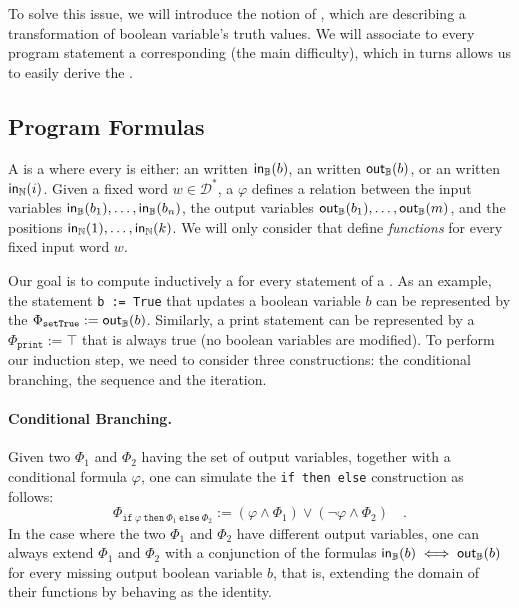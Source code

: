 To solve this issue, we will introduce the notion of ,
which are  describing a transformation of boolean
variable's truth values. We will associate to every program statement a
corresponding  (the main difficulty), which in turns allows
us to easily derive the .



\subsection{Program Formulas}
\label{sec:program-formulas}

\AP A  is a  where every
 is either: an   written
$\mathsf{in}_{\mathbb{B}}(b)$,  an  written $\mathsf{out}_{\mathbb{B}}(b)$, or an
 written $\mathsf{in}_{\mathbb{N}}(i)$. Given a fixed word $w \in
\mathcal{D}^*$, a  $\varphi$ defines a relation between the
input variables $\mathsf{in}_{\mathbb{B}}(b_1), \dots, \mathsf{in}_{\mathbb{B}}(b_n)$, the output variables
$\mathsf{out}_{\mathbb{B}}(b_1), \dots, \mathsf{out}_{\mathbb{B}}(m)$, and the positions $\mathsf{in}_{\mathbb{N}}(1), \dots,
\mathsf{in}_{\mathbb{N}}(k)$. We will only consider  that define
\emph{functions} for every fixed input word $w$.


Our goal is to compute inductively a  for every statement
of a . As an example, the statement \texttt{b := True}
that updates a boolean variable $b$ can be represented by the  $\Phi_{\texttt{setTrue}} := \mathsf{out}_{\mathbb{B}}(b)$. Similarly, a print statement
can be represented by a  $\Phi_{\texttt{print}} := \top$
that is always true (no boolean variables are modified). To perform our
induction step, we need to consider three constructions: the conditional
branching, the sequence and the iteration.


\paragraph{Conditional Branching.} 
Given two  $\Phi_1$ and $\Phi_2$ having 
the set of output variables,
together with a conditional formula $\varphi$, one can 
simulate the \texttt{if then else} construction 
as follows:
\begin{equation*}
    \Phi_{\texttt{if}~\varphi~\texttt{then}~\Phi_1~\texttt{else}~\Phi_2} := (\varphi \land \Phi_1) \lor (\neg \varphi \land \Phi_2) \quad .
\end{equation*}
In the case where the two  $\Phi_1$ and $\Phi_2$ have
different output variables, one can always extend $\Phi_1$ and $\Phi_2$ with
a conjunction of the
formulas $\mathsf{in}_{\mathbb{B}}(b) \iff \mathsf{out}_{\mathbb{B}}(b)$ for every missing output boolean variable $b$,
that is, extending the domain of their functions by behaving as the identity.

